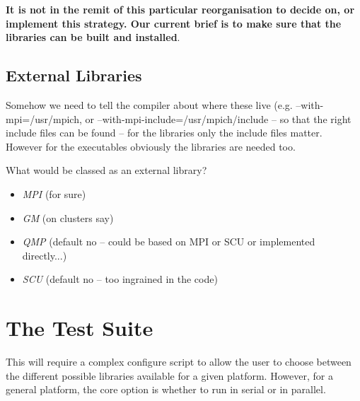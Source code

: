 \documentclass[12pt]{article}
\begin{document}
{\bf It is not in the remit of this particular reorganisation to decide on, 
or implement this strategy. Our current brief is to make sure that the libraries can be built and installed}.

\subsection{External Libraries}
Somehow we need to tell the compiler about where these live (e.g.
--with-mpi=/usr/mpich, or --with-mpi-include=/usr/mpich/include -- so that the
right include files can be found -- for the libraries only the include files
matter. However for the executables obviously the libraries are needed too.

What would be classed as an external library?
\begin{itemize}
 \item \emph{MPI} (for sure)
 \item \emph{GM} (on clusters say)
 \item \emph{QMP}  (default no -- could be based on MPI or SCU or implemented directly...)
 \item \emph{SCU}  (default no -- too ingrained in the code)
\end{itemize}


\section{The Test Suite}
\label{sec:tests}
This will require a complex configure script to allow the user to choose
between the different possible libraries available for a given platform.
However, for a general platform, the core option is whether to run in serial
or in parallel.



\end{document}
